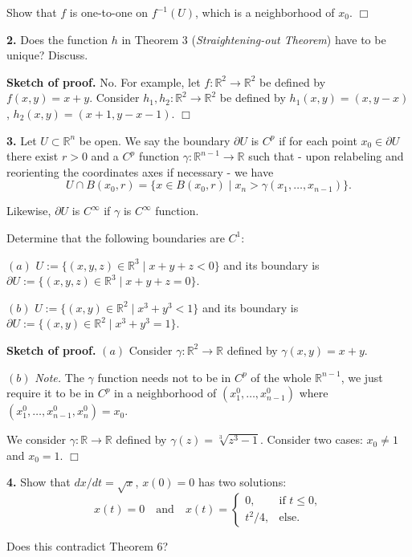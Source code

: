 \documentclass{article}
\begin{document}
Show that $f$ is one-to-one on $f^{-1}(U)$, which is a neighborhood of
$x_0$. $\Box$

    \textbf{2.} Does the function $h$ in Theorem 3 (\emph{Straightening-out
Theorem}) have to be unique? Discuss.

    \textbf{Sketch of proof.} No. For example, let
$f:\mathbb{R}^2 \to \mathbb{R}^2$ be defined by $f(x,y) = x+y$. Consider
$h_1,h_2 :\mathbb{R}^2 \to \mathbb{R}^2$ be defined by
$h_1(x,y) = (x,y -x)$, $h_2(x,y) = (x+1,y-x-1)$. $\Box$

    \textbf{3.} Let $U \subset \mathbb{R}^n$ be open. We say the boundary
$\partial U$ is $C^p$ if for each point $x_0 \in \partial U$ there exist
$r > 0$ and a $C^p$ function $\gamma : \mathbb{R}^{n-1} \to \mathbb{R}$
such that - upon relabeling and reorienting the coordinates axes if
necessary - we have
\[U \cap B(x_0 , r) = \{x \in B(x_0 , r) \mid x_n > \gamma(x_1 , \ldots , x_{n−1})\}.\]

Likewise, $\partial U$ is $C^{\infty}$ if $\gamma$ is $C^{\infty}$
function.

Determine that the following boundaries are $C^1$:

$(a)$ $U := \{(x, y, z) \in \mathbb{R}^3 \mid x + y + z < 0\}$ and its
boundary is
$\partial U := \{(x, y, z) \in \mathbb{R}^3 \mid x + y + z = 0\}$.

$(b)$ $U := \{(x, y) \in \mathbb{R}^2 \mid  x^3 + y^3 < 1\}$ and its
boundary is
$\partial U := \{(x, y) \in \mathbb{R}^2 \mid  x^3 + y^3 = 1\}$.

    \textbf{Sketch of proof.} $(a)$ Consider
$\gamma :\mathbb{R}^2 \to \mathbb{R}$ defined by $\gamma(x,y) = x+y$.

$(b)$ \emph{Note.} The $\gamma$ function needs not to be in $C^p$ of the
whole $\mathbb{R}^{n-1}$, we just require it to be in $C^p$ in a
neighborhood of $(x^0_1,\ldots,x^0_{n-1})$ where
$(x^0_1,\ldots,x^0_{n-1},x^0_n)=x_0 $.

We consider $\gamma :\mathbb{R} \to \mathbb{R}$ defined by
$\gamma(z) = \sqrt[3]{z^3 -1}$. Consider two cases: $x_0 \ne 1$ and
$x_0 = 1$. $\Box$

    \textbf{4.} Show that $dx/dt =\sqrt{x}$, $x(0) = 0$ has two solutions:
\[x(t) = 0 \quad\text{and}\quad x(t) = \begin{cases} 0, & \text{if } t\le 0,\\ t^2/4, &\text{else.}\end{cases}\]

Does this contradict Theorem 6?
\end{document}
